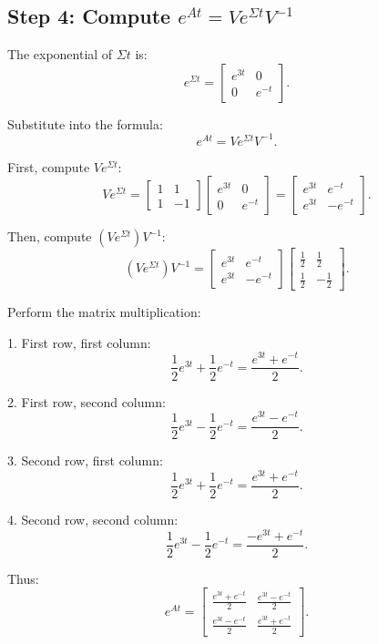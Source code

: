 \documentclass[12pt]{article}
\begin{document}
\subsection*{Step 4: Compute \(e^{At} = V e^{\Sigma t} V^{-1}\)}

The exponential of \(\Sigma t\) is:
\[
e^{\Sigma t} = \begin{bmatrix} e^{3t} & 0 \\ 0 & e^{-t} \end{bmatrix}.
\]

Substitute into the formula:
\[
e^{At} = V e^{\Sigma t} V^{-1}.
\]

First, compute \(V e^{\Sigma t}\):
\[
V e^{\Sigma t} = \begin{bmatrix} 1 & 1 \\ 1 & -1 \end{bmatrix} \begin{bmatrix} e^{3t} & 0 \\ 0 & e^{-t} \end{bmatrix} = \begin{bmatrix} e^{3t} & e^{-t} \\ e^{3t} & -e^{-t} \end{bmatrix}.
\]

Then, compute \((V e^{\Sigma t}) V^{-1}\):
\[
(V e^{\Sigma t}) V^{-1} = \begin{bmatrix} e^{3t} & e^{-t} \\ e^{3t} & -e^{-t} \end{bmatrix} \begin{bmatrix} \frac{1}{2} & \frac{1}{2} \\ \frac{1}{2} & -\frac{1}{2} \end{bmatrix}.
\]

Perform the matrix multiplication:

1. First row, first column:
\[
\frac{1}{2} e^{3t} + \frac{1}{2} e^{-t} = \frac{e^{3t} + e^{-t}}{2}.
\]

2. First row, second column:
\[
\frac{1}{2} e^{3t} - \frac{1}{2} e^{-t} = \frac{e^{3t} - e^{-t}}{2}.
\]

3. Second row, first column:
\[
\frac{1}{2} e^{3t} + \frac{1}{2} e^{-t} = \frac{e^{3t} + e^{-t}}{2}.
\]

4. Second row, second column:
\[
\frac{1}{2} e^{3t} - \frac{1}{2} e^{-t} = \frac{-e^{3t} + e^{-t}}{2}.
\]

Thus:
\[
e^{At} = \begin{bmatrix} 
\frac{e^{3t} + e^{-t}}{2} & \frac{e^{3t} - e^{-t}}{2} \\
\frac{e^{3t} - e^{-t}}{2} & \frac{e^{3t} + e^{-t}}{2}
\end{bmatrix}.
\]
\end{document}
